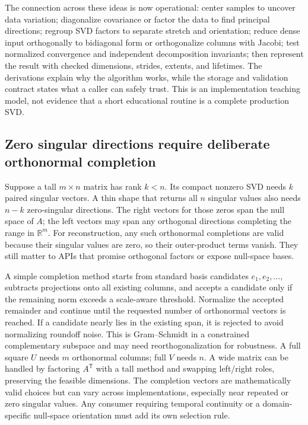 The connection across these ideas is now operational: center samples to uncover data variation; diagonalize covariance or factor the data to find principal directions; regroup SVD factors to separate stretch and orientation; reduce dense input orthogonally to bidiagonal form or orthogonalize columns with Jacobi; test normalized convergence and independent decomposition invariants; then represent the result with checked dimensions, strides, extents, and lifetimes. The derivations explain why the algorithm works, while the storage and validation contract states what a caller can safely trust. This is an implementation teaching model, not evidence that a short educational routine is a complete production SVD.

\subsection{Zero singular directions require deliberate orthonormal completion}\label{zero-singular-directions-require-deliberate-orthonormal-completion}

Suppose a tall \(m\times n\) matrix has rank \(k<n\). Its compact nonzero SVD needs \(k\) paired singular vectors. A thin shape that returns all \(n\) singular values also needs \(n-k\) zero-singular directions. The right vectors for those zeros span the null space of \(A\); the left vectors may span any orthogonal directions completing the range in \(\mathbb R^m\). For reconstruction, any such orthonormal completions are valid because their singular values are zero, so their outer-product terms vanish. They still matter to APIs that promise orthogonal factors or expose null-space bases.

A simple completion method starts from standard basis candidates \(e_1,e_2,\ldots\), subtracts projections onto all existing columns, and accepts a candidate only if the remaining norm exceeds a scale-aware threshold. Normalize the accepted remainder and continue until the requested number of orthonormal vectors is reached. If a candidate nearly lies in the existing span, it is rejected to avoid normalizing roundoff noise. This is Gram--Schmidt in a constrained complementary subspace and may need reorthogonalization for robustness. A full square \(U\) needs \(m\) orthonormal columns; full \(V\) needs \(n\). A wide matrix can be handled by factoring \(A^\mathsf T\) with a tall method and swapping left/right roles, preserving the feasible dimensions. The completion vectors are mathematically valid choices but can vary across implementations, especially near repeated or zero singular values. Any consumer requiring temporal continuity or a domain-specific null-space orientation must add its own selection rule.

